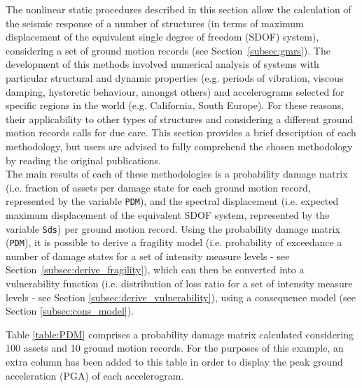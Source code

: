 The nonlinear static procedures described in this section allow the calculation of the seismic response of a number of structures (in terms of maximum displacement of the equivalent single degree of freedom (SDOF) system), considering a set of ground motion records (see Section~\ref{subsec:gmrs}). The development of this methods involved numerical analysis of systems with particular structural and dynamic properties (e.g. periods of vibration, viscous damping, hysteretic behaviour, amongst others) and accelerograms selected for specific regions in the world (e.g. California, South Europe). For these reasons, their applicability to other types of structures and considering a different ground motion records calls for due care. This section provides a brief description of each methodology, but users are advised to fully comprehend the chosen methodology by reading the original publications. \\

The main results of each of these methodologies is a probability damage matrix (i.e. fraction of assets per damage state for each ground motion record, represented by the variable \verb=PDM=), and the spectral displacement (i.e. expected maximum displacement of the equivalent SDOF system, represented by the variable \verb=Sds=) per ground motion record. Using the probability damage matrix (\verb=PDM=), it is possible to derive a fragility model (i.e. probability of exceedance a number of damage states for a set of intensity measure levels - see Section~\ref{subsec:derive_fragility}), which can then be converted into a vulnerability function (i.e. distribution of loss ratio for a set of intensity measure levels - see Section \ref{subsec:derive_vulnerability}), using a consequence model (see Section \ref{subsec:cons_model}).

Table \ref{table:PDM} comprises a probability damage matrix calculated considering 100 assets and 10 ground motion records. For the purposes of this example, an extra column has been added to this table in order to display the peak ground acceleration (PGA) of each accelerogram.

